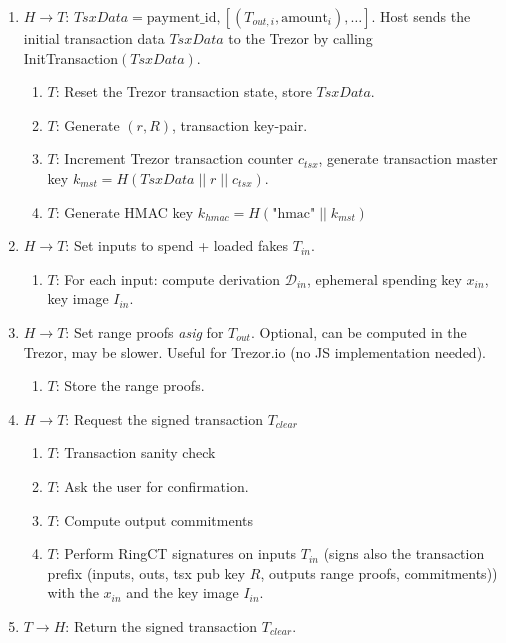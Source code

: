 \documentclass[]{article}
\begin{document}
\begin{enumerate}
	\item $H \rightarrow T$: $TsxData = \text{payment\_id}, \left[\left(T_{out,i}, \text{amount}_i \right), \dots \right]$. Host sends the initial transaction data $TsxData$ to the Trezor by calling\\ InitTransaction$\left(TsxData\right)$.
	
	\begin{enumerate}
		\item $T$: Reset the Trezor transaction state, store $TsxData$.
		
		\item $T$: Generate $(r, R)$, transaction key-pair.
		
		\item $T$: Increment Trezor transaction counter $c_{tsx}$, generate transaction master key $k_{mst} = H(TsxData \; || \; r \; || \; c_{tsx})$.
		
		\item $T$: Generate HMAC key $k_{hmac} = H\left(\text{"hmac"} \; || \; k_{mst}\right)$
	\end{enumerate}
	
	\item $H \rightarrow T$: Set inputs to spend + loaded fakes $T_{in}$. 
	\begin{enumerate}
		\item $T$: For each input: compute derivation $\mathcal{D}_{in}$, ephemeral spending key $x_{in}$, key image $I_{in}$.
	\end{enumerate}
	
	\item $H \rightarrow T$: Set range proofs \emph{asig} for $T_{out}$. Optional, can be computed in the Trezor, may be slower. Useful for Trezor.io (no JS implementation needed).
	\begin{enumerate}
		\item $T$: Store the range proofs.
	\end{enumerate}
	
	\item $H \rightarrow T$: Request the signed transaction $T_{clear}$
	\begin{enumerate}
		\item $T$: Transaction sanity check
		
        \item $T$: Ask the user for confirmation.

		\item $T$: Compute output commitments
		
		\item $T$: Perform RingCT signatures on inputs $T_{in}$ (signs also the transaction prefix (inputs, outs, tsx pub key $R$, outputs range proofs, commitments)) with the $x_{in}$ and the key image $I_{in}$.
	\end{enumerate} 
	
	\item $T \rightarrow H$: Return the signed transaction $T_{clear}$.
\end{enumerate}
\end{document}
